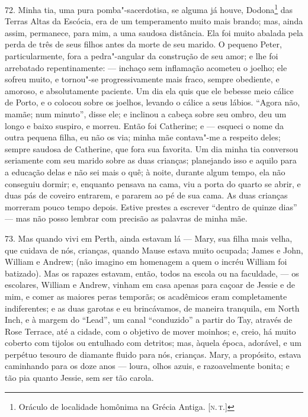 72. Minha tia, uma pura pomba"-sacerdotisa, se alguma já houve,
Dodona\footnote{Oráculo de localidade homônima na Grécia Antiga. {[}\textsc{n.\,t.}{]}} das Terras Altas da Escócia, era de um temperamento muito mais
brando; mas, ainda assim, permanece, para mim, a uma saudosa distância.
Ela foi muito abalada pela perda de três de seus filhos antes da morte
de seu marido. O pequeno Peter, particularmente, fora a pedra"-angular da
construção de seu amor; e lhe foi arrebatado repentinamente: --- inchaço
sem inflamação acometeu o joelho; ele sofreu muito, e tornou"-se
progressivamente mais fraco, sempre obediente, e amoroso, e
absolutamente paciente. Um dia ela quis que ele bebesse meio cálice de
Porto, e o colocou sobre os joelhos, levando o cálice a seus lábios.
``Agora não, mamãe; num minuto'', disse ele; e inclinou a cabeça sobre
seu ombro, deu um longo e baixo suspiro, e morreu. Então foi Catherine;
e --- esqueci o nome da outra pequena filha, eu não os via; minha mãe
contava"-me a respeito deles; sempre saudosa de Catherine, que fora sua
favorita. Um dia minha tia conversou seriamente com seu marido sobre as
duas crianças; planejando isso e aquilo para a educação delas e não sei
mais o quê; à noite, durante algum tempo, ela não conseguiu dormir; e,
enquanto pensava na cama, viu a porta do quarto se abrir, e duas pás de
coveiro entrarem, e pararem ao pé de sua cama. As duas crianças morreram
pouco tempo depois. Estive prestes a escrever ``dentro de quinze dias''
--- mas não posso lembrar com precisão as palavras de minha mãe.

73. Mas quando vivi em Perth, ainda estavam lá --- Mary, sua filha mais
velha, que cuidava de nós, crianças, quando Mause estava muito ocupada;
James e John, William e Andrew; (não imagino em homenagem a quem o
incréu William foi batizado). Mas os rapazes estavam, então, todos na
escola ou na faculdade, --- os escolares, William e Andrew, vinham em
casa apenas para caçoar de Jessie e de mim, e comer as maiores peras
temporãs; os acadêmicos eram completamente indiferentes; e as duas
garotas e eu brincávamos, de maneira tranquila, em North Inch, e à
margem do ``Lead'', um canal ``conduzido'' a partir do Tay, através de
Rose Terrace, até a cidade, com o objetivo de mover moinhos; e, creio,
há muito coberto com tijolos ou entulhado com detritos; mas, àquela
época, adorável, e um perpétuo tesouro de diamante fluido para nós,
crianças. Mary, a propósito, estava caminhando para os doze anos ---
loura, olhos azuis, e razoavelmente bonita; e tão pia quanto Jessie, sem
ser tão carola.

